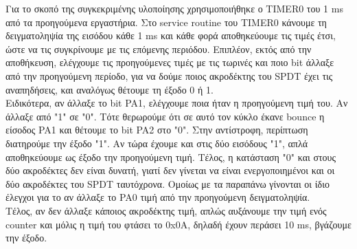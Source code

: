 \documentclass{article}
\begin{document}
	\noindent
	Για το σκοπό της συγκεκριμένης υλοποίησης χρησιμοποιήθηκε ο TIMER0 του 1 ms από τα προηγούμενα εργαστήρια. Στο service routine του TIMER0 κάνουμε τη δειγματοληψία της εισόδου κάθε 1 ms και κάθε φορά αποθηκεύουμε τις τιμές έτσι, ώστε να τις συγκρίνουμε με τις επόμενης περιόδου. Επιπλέον, εκτός από την αποθήκευση, ελέγχουμε τις προηγούμενες τιμές με τις τωρινές και ποιο bit άλλαξε από την προηγούμενη περίοδο, για να δούμε ποιος ακροδέκτης του SPDT έχει τις αναπηδήσεις, και αναλόγως θέτουμε τη έξοδο 0 ή 1. \\
	
	\noindent
	Ειδικότερα, αν άλλαξε το bit PA1, ελέγχουμε ποια ήταν η προηγούμενη τιμή του. Αν άλλαξε από "1" σε "0". Τότε θερωρούμε ότι σε αυτό τον κύκλο έκανε bounce η είσοδος PA1 και θέτουμε το bit PA2 στο "0". Στην αντίστροφη, περίπτωση διατηρούμε την έξοδο "1". Αν τώρα έχουμε και στις δύο εισόδους "1", απλά αποθηκεύουμε ως έξοδο την προηγούμενη τιμή. Τέλος, η κατάσταση "0" και στους δύο ακροδέκτες δεν είναι δυνατή, γιατί δεν γίνεται να είναι ενεργοποιημένοι και οι δύο ακροδέκτες του SPDT ταυτόχρονα. Ομοίως με τα παραπάνω γίνονται οι ίδιο έλεγχοι για το αν άλλαξε το PA0 τιμή από την προηγούμενη δειγματοληψία. \\
	
	\noindent
	Τέλος, αν δεν άλλαξε κάποιος ακροδέκτης τιμή, απλώς αυξάνουμε την τιμή ενός counter και μόλις η τιμή του φτάσει το 0x0A, δηλαδή έχουν περάσει 10 ms, βγάζουμε την έξοδο.
	
\end{document}
